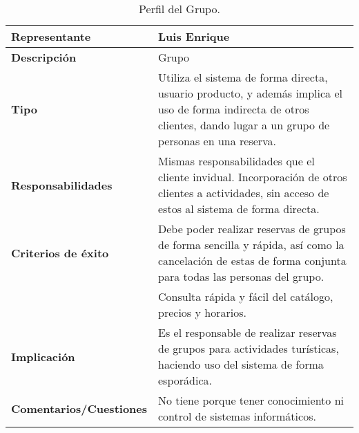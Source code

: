 \begin{table}
    \centering
    \begin{tabular}{|p{5cm}|p{10cm}|}
        \hline
        \cellcolor[HTML]{FFCCC9}\textbf{Representante} & Luis Enrique \\ \hline
        \cellcolor[HTML]{FFCCC9}\textbf{Descripción} & Grupo \\ \hline
        \cellcolor[HTML]{FFCCC9}\textbf{Tipo} & Utiliza el sistema de forma directa, usuario producto, y además implica el uso de forma indirecta de otros clientes, dando lugar a un grupo de personas en una reserva. \\ \hline
        \cellcolor[HTML]{FFCCC9}\textbf{Responsabilidades} & Mismas responsabilidades que el cliente invidual. Incorporación de otros clientes a actividades, sin acceso de estos al sistema de forma directa. \\ \hline
        \cellcolor[HTML]{FFCCC9}\textbf{Criterios de éxito} & Debe poder realizar reservas de grupos de forma sencilla y rápida, así como la cancelación de estas de forma conjunta para todas las personas del grupo. \\ \cellcolor[HTML]{FFCCC9}& Consulta rápida y fácil del catálogo, precios y horarios. \\ \hline
        \cellcolor[HTML]{FFCCC9}\textbf{Implicación} & Es el responsable de realizar reservas de grupos para actividades turísticas, haciendo uso del sistema de forma esporádica. \\ \hline
        \cellcolor[HTML]{FFCCC9}\textbf{Comentarios/Cuestiones} & No tiene porque tener conocimiento ni control de sistemas informáticos. \\ \hline
    \end{tabular}
    \caption{Perfil del Grupo.}
    \label{tab:per-grupo}
\end{table}
